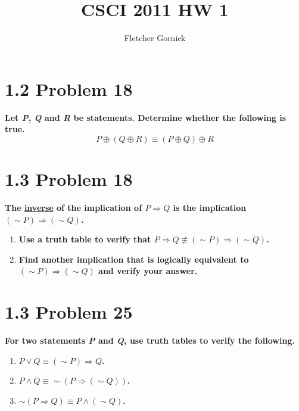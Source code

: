 \documentclass[10pt]{article}
\title{CSCI 2011 HW 1}
\author{Fletcher Gornick}
\begin{document}
\maketitle

\section{1.2 Problem 18}
\textbf{Let \textit{P}, \textit{Q} and \textit{R} be statements. Determine whether
the following is true.} $$P \oplus (Q \oplus R) \equiv (P \oplus Q) \oplus R$$



\section{1.3 Problem 18}
\textbf{The \underline{inverse} of the implication of $P \Rightarrow Q$ is the
implication $(\sim P) \Rightarrow (\sim Q)$.}

\begin{enumerate}[label=(\alph*)]

    \item \textbf{Use a truth table to verify that $P \Rightarrow Q \not\equiv 
        (\sim P) \Rightarrow (\sim Q)$.}

    \item \textbf{Find another implication that is logically equivalent to
        $(\sim P) \Rightarrow (\sim Q)$ and verify your answer.}

\end{enumerate}



\section{1.3 Problem 25}
\textbf{For two statements \textit{P} and \textit{Q}, use truth tables to verify
the following.}

\begin{enumerate}[label=(\alph*)]

    \item \textbf{$P \vee Q \equiv (\sim P) \Rightarrow Q$.}

    \item \textbf{$P \wedge Q \equiv \sim (P \Rightarrow (\sim Q))$.}
        
    \item \textbf{$\sim (P \Rightarrow Q) \equiv P \wedge (\sim Q)$.}

\end{enumerate}
\end{document}
